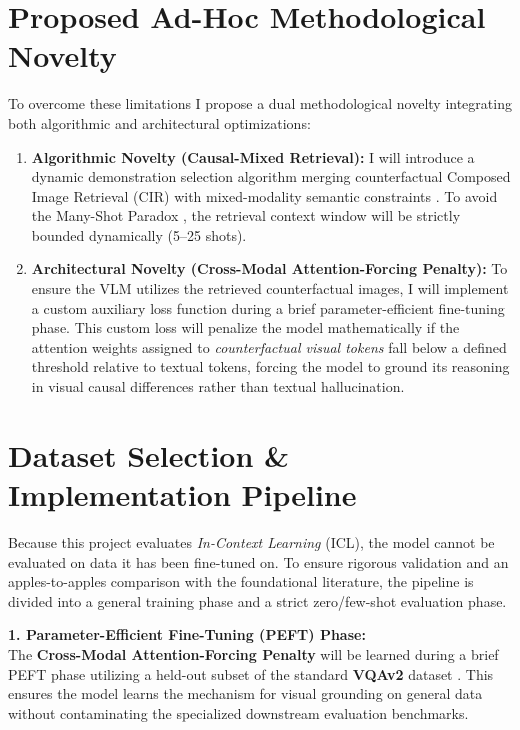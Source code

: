 \documentclass[11pt, letterpaper]{article}
\begin{document}
\section{Proposed Ad-Hoc Methodological Novelty}
To overcome these limitations I propose a dual methodological novelty integrating both algorithmic and architectural optimizations:
\begin{enumerate}[noitemsep, topsep=2pt]
    \item \textbf{Algorithmic Novelty (Causal-Mixed Retrieval):} I will introduce a dynamic demonstration selection algorithm merging counterfactual Composed Image Retrieval (CIR) \cite{xiong2026retrieving} with mixed-modality semantic constraints \cite{chen2024understanding}. To avoid the Many-Shot Paradox \cite{oskooei2025many}, the retrieval context window will be strictly bounded dynamically (5--25 shots). 
    \item \textbf{Architectural Novelty (Cross-Modal Attention-Forcing Penalty):} To ensure the VLM utilizes the retrieved counterfactual images, I will implement a custom auxiliary loss function during a brief parameter-efficient fine-tuning phase. This custom loss will penalize the model mathematically if the attention weights assigned to \textit{counterfactual visual tokens} fall below a defined threshold relative to textual tokens, forcing the model to ground its reasoning in visual causal differences rather than textual hallucination.
\end{enumerate}

\section{Dataset Selection \& Implementation Pipeline}
Because this project evaluates \textit{In-Context Learning} (ICL), the model cannot be evaluated on data it has been fine-tuned on. To ensure rigorous validation and an apples-to-apples comparison with the foundational literature, the pipeline is divided into a general training phase and a strict zero/few-shot evaluation phase.

\textbf{1. Parameter-Efficient Fine-Tuning (PEFT) Phase:}\\
The \textbf{Cross-Modal Attention-Forcing Penalty} will be learned during a brief PEFT phase utilizing a held-out subset of the standard \textbf{VQAv2} dataset \cite{goyal2017making}. This ensures the model learns the mechanism for visual grounding on general data without contaminating the specialized downstream evaluation benchmarks.
\end{document}
